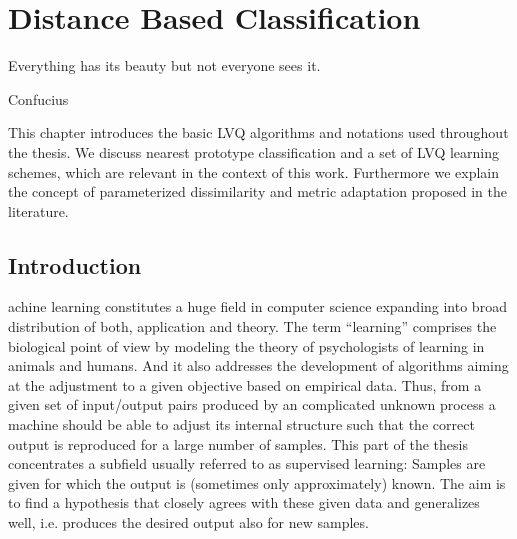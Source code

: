 


\chapter{Distance Based Classification}%
\label{chapter:LVQ}


\epigraph{Everything has its beauty but not everyone sees it.}{Confucius}


\begin{Abstract}
This chapter introduces %
the basic \acf{LVQ} algorithms and notations used throughout the thesis. 
We discuss nearest prototype classification and a set of \ac{LVQ} learning schemes, 
which are relevant in the context of this work. 
Furthermore we explain the concept of parameterized dissimilarity and metric adaptation proposed in the literature.
\end{Abstract}

\acresetall 

\section{Introduction}
\label{sec:biological_aspects}

achine learning \cite{Mitchell1997,Bishop2007} constitutes a huge field in computer science 
expanding into broad distribution of both, application and theory. 
The term ``learning'' comprises the biological point of view by modeling the theory of psychologists of learning in animals and humans. 
And it also addresses the development of algorithms aiming at the adjustment to a given objective based on empirical data. 
Thus, from a given set of input/output pairs produced by an complicated unknown process a machine 
should be able to adjust its internal structure such that the correct output is reproduced for a large number of samples. 
This part of the thesis concentrates a subfield usually referred to as supervised learning: 
Samples are given for which the output is (sometimes only approximately) known. 
The aim is to find a hypothesis that closely agrees with these given data and generalizes well, 
i.e. produces the desired output also for new samples. 

